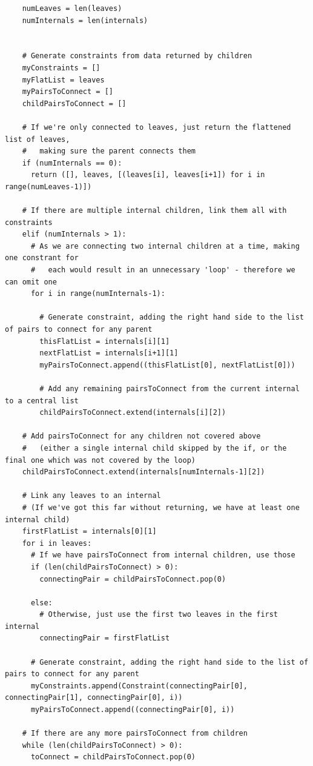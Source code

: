 \documentclass[11pt]{article} %
\begin{document}
\begin{landscape}
\begin{lstlisting}
    numLeaves = len(leaves)
    numInternals = len(internals)


    # Generate constraints from data returned by children
    myConstraints = []
    myFlatList = leaves
    myPairsToConnect = []
    childPairsToConnect = []

    # If we're only connected to leaves, just return the flattened list of leaves,
    #   making sure the parent connects them
    if (numInternals == 0):
      return ([], leaves, [(leaves[i], leaves[i+1]) for i in range(numLeaves-1)])

    # If there are multiple internal children, link them all with constraints
    elif (numInternals > 1):
      # As we are connecting two internal children at a time, making one constrant for
      #   each would result in an unnecessary 'loop' - therefore we can omit one
      for i in range(numInternals-1):
        
        # Generate constraint, adding the right hand side to the list of pairs to connect for any parent
        thisFlatList = internals[i][1]
        nextFlatList = internals[i+1][1]
        myPairsToConnect.append((thisFlatList[0], nextFlatList[0]))

        # Add any remaining pairsToConnect from the current internal to a central list
        childPairsToConnect.extend(internals[i][2])
    
    # Add pairsToConnect for any children not covered above
    #   (either a single internal child skipped by the if, or the final one which was not covered by the loop)
    childPairsToConnect.extend(internals[numInternals-1][2])
    
    # Link any leaves to an internal
    # (If we've got this far without returning, we have at least one internal child)
    firstFlatList = internals[0][1]
    for i in leaves:
      # If we have pairsToConnect from internal children, use those
      if (len(childPairsToConnect) > 0):
        connectingPair = childPairsToConnect.pop(0)
      
      else:
        # Otherwise, just use the first two leaves in the first internal
        connectingPair = firstFlatList
      
      # Generate constraint, adding the right hand side to the list of pairs to connect for any parent
      myConstraints.append(Constraint(connectingPair[0], connectingPair[1], connectingPair[0], i))
      myPairsToConnect.append((connectingPair[0], i))
    
    # If there are any more pairsToConnect from children
    while (len(childPairsToConnect) > 0):
      toConnect = childPairsToConnect.pop(0)


\end{lstlisting}
\end{landscape}
\end{document}
